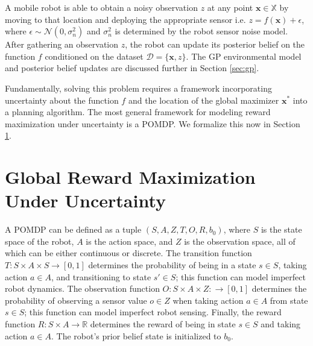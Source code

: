 \documentclass{styles/svproc}
\newcommand{\x}{\mathbf{x}}
\begin{document}
A mobile robot is able to obtain a noisy observation $z$ at any point $\x \in \mathbb{X}$ by moving to that location and deploying the appropriate sensor i.e. $z = f(\x) + \epsilon$, where $\epsilon \sim \mathcal{N}(0, \sigma_n^2)$ and $\sigma_n^2$ is determined by the robot sensor noise model. After gathering an observation $z$, the robot can update its posterior belief on the function $f$ conditioned on the dataset $\mathcal{D} = \{\x, z\}$. The GP environmental model and posterior belief updates are discussed further in Section \ref{sec:gp}.

Fundamentally, solving this problem requires a framework incorporating uncertainty about the function $f$ and the location of the global maximizer $\x^*$ into a planning algorithm. The most general framework for modeling reward maximization under uncertainty is a POMDP. We formalize this now in Section \ref{sec:uncertainty}.


\section{Global Reward Maximization Under Uncertainty}
\label{sec:uncertainty}

A POMDP can be defined as a tuple $(S, A, Z, T, O, R, b_0)$, where $S$ is the state space of the robot, $A$ is the action space, and $Z$ is the observation space, all of which can be either continuous or discrete. The transition function $T: S \times A \times S \to [0, 1]$ determines the probability of being in a state $s \in S$, taking action $a \in A$, and transitioning to state $s' \in S$; this function can model imperfect robot dynamics. The observation function $O: S \times A \times Z: \to [0, 1]$ determines the probability of observing a sensor value $o \in Z$ when taking action $a \in A$ from state $s \in S$; this function can model imperfect robot sensing. Finally, the reward function $R: S \times A \to \mathbb{R}$ determines the reward of being in state $s \in S$ and taking action $a \in A$. The robot's prior belief state is initialized to $b_0$.
\end{document}
